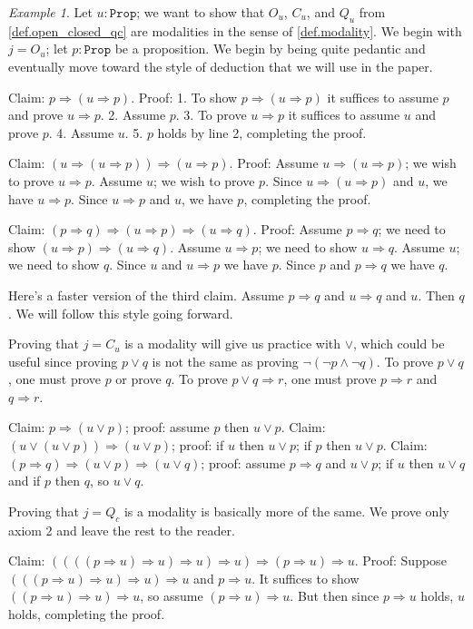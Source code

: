 \documentclass[11pt, oneside, article]{memoir}
\theoremstyle{plain}
\theoremstyle{definition}
\theoremstyle{remark}
\newtheorem{example}[theorem]{Example}
\newcommand{\const}[1]{\mathtt{#1}}
\newcommand{\prop}{\const{Prop}}
\newcommand{\imp}{\Rightarrow}
\begin{document}
\begin{example}\label{ex.modality_deduction}
Let $u:\prop$; we want to show that $O_u$, $C_u$, and $Q_u$ from \cref{def.open_closed_qc} are modalities in the sense of \cref{def.modality}. We begin with $j=O_u$; let $p:\prop$ be a proposition. We begin by being quite pedantic and eventually move toward the style of deduction that we will use in the paper.

Claim: $p\imp (u\imp p)$. Proof: 1. To show $p\imp (u\imp p)$ it suffices to assume $p$ and prove $u\imp p$. 2. Assume $p$. 3. To prove $u\imp p$ it suffices to assume $u$ and prove $p$. 4. Assume $u$. 5. $p$ holds by line 2, completing the proof.

Claim: $(u\imp(u\imp p))\imp (u\imp p)$. Proof: Assume $u\imp (u\imp p)$; we wish to prove $u\imp p$. Assume $u$; we wish to prove $p$. Since $u\imp (u\imp p)$ and $u$, we have $u\imp p$. Since $u\imp p$ and $u$, we have $p$, completing the proof.

Claim: $(p\imp q)\imp (u\imp p)\imp (u\imp q)$. Proof: Assume $p\imp q$; we need to show $(u\imp p)\imp (u\imp q)$. Assume $u\imp p$; we need to show $u\imp q$. Assume $u$; we need to show $q$. Since $u$ and $u\imp p$ we have $p$. Since $p$ and $p\imp q$ we have $q$.

Here's a faster version of the third claim. Assume $p\imp q$ and $u\imp q$ and $u$. Then $q$. We will follow this style going forward.

Proving that $j=C_u$ is a modality will give us practice with $\vee$, which could be useful since proving $p\vee q$ is not the same as proving $\neg(\neg p\wedge\neg q)$. To prove $p\vee q$, one must prove $p$ or prove $q$. To prove $p\vee q \imp r$, one must prove $p\imp r$ and $q\imp r$.

Claim: $p\imp (u\vee p)$; proof: assume $p$ then $u\vee p$. Claim: $(u\vee (u\vee p))\imp (u\vee p)$; proof: if $u$ then $u\vee p$; if $p$ then $u\vee p$. Claim: $(p\imp q)\imp (u\vee p)\imp (u\vee q)$; proof: assume $p\imp q$ and $u\vee p$; if $u$ then $u\vee q$ and if $p$ then $q$, so $u\vee q$.

Proving that $j=Q_c$ is a modality is basically more of the same. We prove only axiom 2 and leave the rest to the reader.

Claim: $((((p\imp u)\imp u)\imp u)\imp u)\imp (p\imp u)\imp u$. Proof: Suppose $(((p\imp u)\imp u)\imp u)\imp u$ and $p\imp u$. It suffices to show $((p\imp u)\imp u)\imp u$, so assume $(p\imp u)\imp u$. But then since $p\imp u$ holds, $u$ holds, completing the proof.
\end{example}
\end{document}
